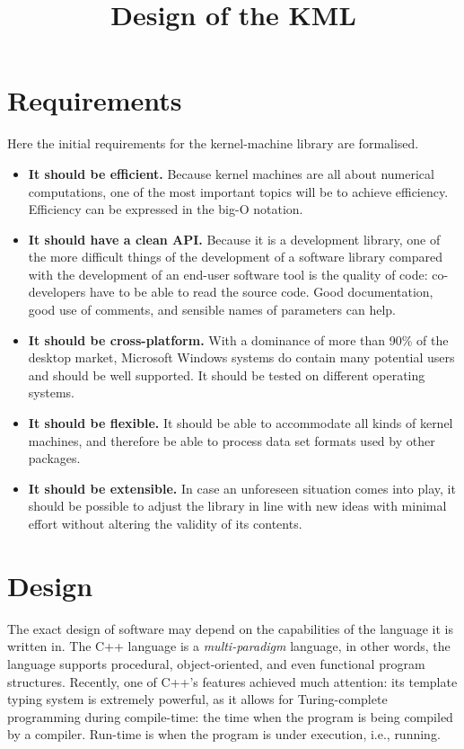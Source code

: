 \documentclass{article}
\begin{document}
\title{Design of the KML}
\maketitle

\section{Requirements}

Here the initial requirements for the kernel-machine library are formalised.

\begin{itemize}
\item \textbf{It should be efficient.} Because kernel machines are all about
numerical computations, one of the most important topics will be to
achieve efficiency. Efficiency can be expressed in the big-O notation.
\item \textbf{It should have a clean API.}
Because it is a development library, one of the more difficult things
of the development of a software library compared with the development
of an end-user software tool is the quality of code: co-developers
have to be able to read the source code. Good documentation, good
use of comments, and sensible names of parameters can help. 
\item \textbf{It should be cross-platform.} With a dominance of more than
90\% of the desktop market, Microsoft Windows systems do contain many
potential users and should be well supported. It should be tested
on different operating systems. 
\item \textbf{It should be flexible.} It should be able to accommodate all
kinds of kernel machines, and therefore be able to process data set
formats used by other packages.
\item \textbf{It should be extensible.} In case an unforeseen situation
comes into play, it should be possible to adjust the library in line
with new ideas with minimal effort without altering the validity of
its contents.
\end{itemize}

\section{Design}
%
The exact design of software may depend on the capabilities of the language
it is written in. The C++ language is a \emph{multi-paradigm} language,
in other words, the language supports procedural, object-oriented,
and even functional program structures. Recently, one of C++'s features
achieved much attention: its template typing system is extremely powerful,
as it allows for Turing-complete programming during compile-time:
the time when the program is being compiled by a compiler. Run-time
is when the program is under execution, i.e., running. 
\end{document}
